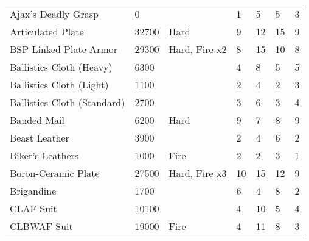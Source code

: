 \documentclass[twoside]{book}
\begin{document}
\begin{longtable}{p{1.25in}llp{2em}p{2em}p{2em}p{2em}}
  \raggedright
           Ajax's Deadly Grasp
           
  &
   0 
  &
  
  &
   1 
  &
   5 
  &
   5 
  &
   3 
  \tabularnewline
      
  \raggedright
           Articulated Plate 
  &
   32700 
  &
   Hard 
  &
   9 
  &
   12 
  &
   15 
  &
   9 
  \tabularnewline
      
  \raggedright
           BSP Linked Plate Armor 
  &
   29300 
  &
   Hard, Fire x2 
  &
   8 
  &
   15 
  &
   10 
  &
   8 
  \tabularnewline
      
  \raggedright
           Ballistics Cloth (Heavy)
           
  &
   6300 
  &
  
  &
   4 
  &
   8 
  &
   5 
  &
   5 
  \tabularnewline
      
  \raggedright
           Ballistics Cloth (Light)
           
  &
   1100 
  &
  
  &
   2 
  &
   4 
  &
   2 
  &
   3 
  \tabularnewline
      
  \raggedright
           Ballistics Cloth (Standard)
           
  &
   2700 
  &
  
  &
   3 
  &
   6 
  &
   3 
  &
   4 
  \tabularnewline
      
  \raggedright
           Banded Mail 
  &
   6200 
  &
   Hard 
  &
   9 
  &
   7 
  &
   8 
  &
   9 
  \tabularnewline
      
  \raggedright
           Beast Leather 
  &
   3900 
  &
  
  &
   2 
  &
   4 
  &
   6 
  &
   2 
  \tabularnewline
      
  \raggedright
           Biker's Leathers 
  &
   1000 
  &
   Fire 
  &
   2 
  &
   2 
  &
   3 
  &
   1 
  \tabularnewline
      
  \raggedright
           Boron-Ceramic Plate 
  &
   27500 
  &
   Hard, Fire x3 
  &
   10 
  &
   15 
  &
   12 
  &
   9 
  \tabularnewline
      
  \raggedright
           Brigandine 
  &
   1700 
  &
  
  &
   6 
  &
   4 
  &
   8 
  &
   2 
  \tabularnewline
      
  \raggedright
           CLAF Suit 
  &
   10100 
  &
  
  &
   4 
  &
   10 
  &
   5 
  &
   4 
  \tabularnewline
      
  \raggedright
           CLBWAF Suit 
  &
   19000 
  &
   Fire 
  &
   4 
  &
   11 
  &
   8 
  &
   3 
  \tabularnewline
      

\end{longtable}
\end{document}
